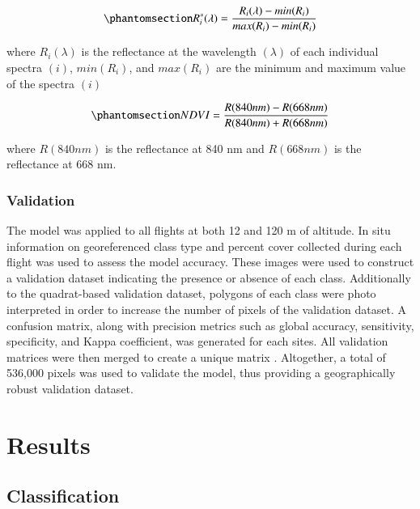 \documentclass[
  number]{elsarticle}
\begin{document}
\begin{equation}\phantomsection\label{eq-std}{
R_{i}^{*}(\lambda) = \frac{R_{i}(\lambda) - min(R_{i})}{max(R_{i})- min(R_{i})}
}\end{equation}

where \(R_{i}(\lambda)\) is the reflectance at the wavelength
\((\lambda)\) of each individual spectra \((i)\), \(min(R_{i})\), and
\(max(R_{i})\) are the minimum and maximum value of the spectra \((i)\)

\begin{equation}\phantomsection\label{eq-ndvi}{
NDVI = \frac{R(840nm)-R(668nm)}{R(840nm)+R(668nm)}
}\end{equation}

where \(R(840nm)\) is the reflectance at 840 nm and \(R(668nm)\) is the
reflectance at 668 nm.

\subsubsection{Validation}\label{validation}

The model was applied to all flights at both 12 and 120 m of altitude.
In situ information on georeferenced class type and percent cover
collected during each flight was used to assess the model accuracy.
These images were used to construct a validation dataset indicating the
presence or absence of each class. Additionally to the quadrat-based
validation dataset, polygons of each class were photo interpreted in
order to increase the number of pixels of the validation dataset. A
confusion matrix, along with precision metrics such as global accuracy,
sensitivity, specificity, and Kappa coefficient, was generated for each
sites. All validation matrices were then merged to create a unique
matrix . Altogether, a total of 536,000 pixels was used to validate the
model, thus providing a geographically robust validation dataset.

\section{Results}\label{results}

\subsection{Classification}\label{classification}
\end{document}
